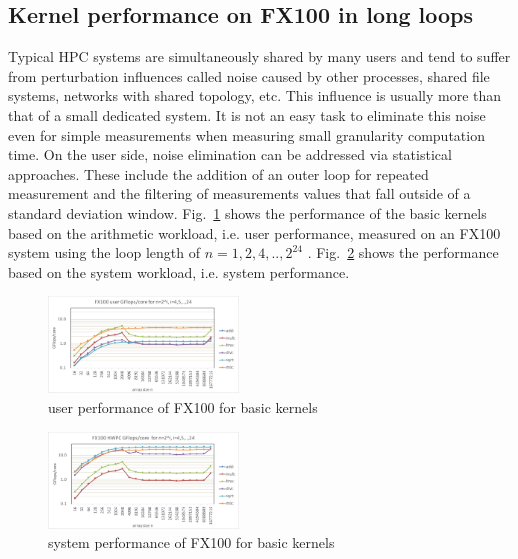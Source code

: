 \documentclass[conference]{IEEEtran}
\begin{document}
\subsection{Kernel performance on FX100 in long loops}
\label{subsection:long-kernels-fx100}
%
%
%
%
Typical HPC systems are simultaneously shared by many users and tend to
suffer from perturbation influences called noise caused by other processes,
shared file systems, networks with shared topology, etc.
This influence is usually more than that of a small dedicated system.
It is not an easy task to eliminate this noise even for simple measurements 
when measuring small granularity computation time.
On the user side, noise elimination can be addressed via statistical
approaches. These include the addition of an outer loop for repeated
measurement and the filtering of measurements values that fall outside of
a standard deviation window.
\fi
%
%
Fig.~\ref{fig:fx100-gflops-user-long-R8} shows the 
performance of the basic kernels based on the arithmetic workload,
i.e. user performance,
measured on an FX100 system using the loop length of
\begin{math}
n=1,2,4,..,2^{24}
\end{math}
.
Fig.~\ref{fig:fx100-gflops-system-long-R8} shows the 
performance based on the system workload, i.e. system performance.

\begin{figure}[b]
\centering
\includegraphics[width=0.45\textwidth]{figs/fx100-gflops-user-long-R8.pdf}
\caption{user performance of FX100 for basic kernels}
\label{fig:fx100-gflops-user-long-R8}
\end{figure}

\begin{figure}[tb]
\centering
\includegraphics[width=0.45\textwidth]{figs/fx100-gflops-system-long-R8.pdf}
\caption{system performance of FX100 for basic kernels}
\label{fig:fx100-gflops-system-long-R8}
\end{figure}
\end{document}

